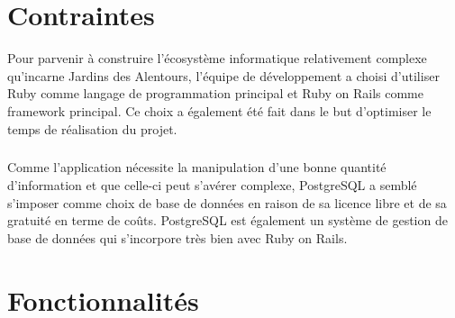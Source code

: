 \documentclass{scrreprt}
\def\projectname{Jardins des Alentours}
\begin{document}
\chapter{Contraintes}
Pour parvenir à construire l'écosystème informatique relativement complexe qu'incarne \projectname{},
l'équipe de développement a choisi d'utiliser Ruby comme langage de programmation principal et Ruby on Rails comme framework principal.
Ce choix a également été fait dans le but d'optimiser le temps de réalisation du projet.

\paragraph{}
Comme l'application nécessite la manipulation d'une bonne quantité d'information
et que celle-ci peut s'avérer complexe, PostgreSQL a semblé
s'imposer comme choix de base de données en raison de sa licence libre et de sa
gratuité en terme de coûts. PostgreSQL est également un système de gestion de
base de données qui s'incorpore très bien avec Ruby on Rails.

\chapter{Fonctionnalités}
\end{document}
